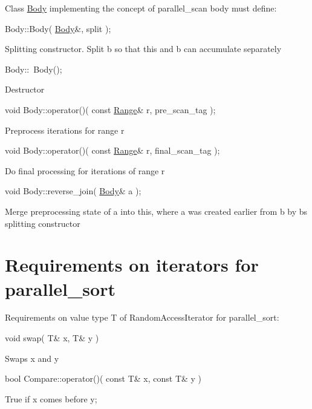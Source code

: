Class {\ttfamily \hyperlink{classBody}{Body}} implementing the concept of parallel\+\_\+scan body must define\+:
\begin{DoxyItemize}
\item 
\begin{DoxyCode}
Body::Body( \hyperlink{classBody}{Body}&, split ); 
\end{DoxyCode}
 Splitting constructor. Split {\ttfamily b} so that {\ttfamily this} and {\ttfamily b} can accumulate separately
\item 
\begin{DoxyCode}
Body::~Body(); 
\end{DoxyCode}
 Destructor
\item 
\begin{DoxyCode}
\textcolor{keywordtype}{void} Body::operator()( \textcolor{keyword}{const} \hyperlink{classtbb_1_1blocked__range}{Range}& r, pre\_scan\_tag ); 
\end{DoxyCode}
 Preprocess iterations for range {\ttfamily r} 
\item 
\begin{DoxyCode}
\textcolor{keywordtype}{void} Body::operator()( \textcolor{keyword}{const} \hyperlink{classtbb_1_1blocked__range}{Range}& r, final\_scan\_tag ); 
\end{DoxyCode}
 Do final processing for iterations of range {\ttfamily r} 
\item 
\begin{DoxyCode}
\textcolor{keywordtype}{void} Body::reverse\_join( \hyperlink{classBody}{Body}& a ); 
\end{DoxyCode}
 Merge preprocessing state of {\ttfamily a} into {\ttfamily this}, where {\ttfamily a} was created earlier from {\ttfamily b} by b\textquotesingle{}s splitting constructor 
\end{DoxyItemize}\hypertarget{parallel_sort_iter_req}{}\section{Requirements on iterators for parallel\+\_\+sort}\label{parallel_sort_iter_req}
Requirements on value type {\ttfamily T} of {\ttfamily Random\+Access\+Iterator} for {\ttfamily parallel\+\_\+sort\+:} 
\begin{DoxyItemize}
\item 
\begin{DoxyCode}
\textcolor{keywordtype}{void} swap( T& x, T& y ) 
\end{DoxyCode}
 Swaps {\ttfamily x} and {\ttfamily y} 
\item 
\begin{DoxyCode}
\textcolor{keywordtype}{bool} Compare::operator()( \textcolor{keyword}{const} T& x, \textcolor{keyword}{const} T& y ) 
\end{DoxyCode}
 True if x comes before y; 
\end{DoxyItemize}